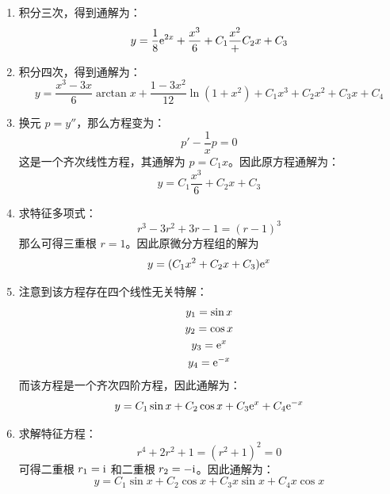 \begin{problem}
    \begin{solution}
        
        \begin{enumerate}
            \item[\textbf{1)}] 积分三次，得到通解为：
            $$
            y = \frac{1}{8} \mathrm{e}^{2x} + \frac{x^3}{6} + C_1 \frac{x^2} + C_2 x + C_3
            $$
            
            \item[\textbf{2)}] 积分四次，得到通解为：
            $$
            y = \frac{x^3 - 3x}{6} \arctan x + \frac{1 - 3x^2}{12} \ln (1 + x^2) + C_1 x^3 + C_2 x^2 + C_3 x + C_4
            $$
    
            \item[\textbf{3)}] 换元 $p = y''$，那么方程变为：
            $$
            p' - \frac{1}{x} p = 0
            $$
            这是一个齐次线性方程，其通解为 $p = C_1 x$。因此原方程通解为：
            $$
            y = C_1 \frac{x^3}{6} + C_2 x + C_3
            $$
    
            \item[\textbf{4)}] 求特征多项式：
            $$
            r^3 - 3r^2 + 3r - 1 = (r - 1)^3
            $$
            那么可得三重根 $r = 1$。因此原微分方程组的解为
            $$
            y = (C_1 x^2 + C_2 x + C_3) \mathrm{e}^{x}
            $$
    
            \item[\textbf{5)}] 注意到该方程存在四个线性无关特解：
            $$
            \begin{gathered}
                y_1 = \sin x \\
                y_2 = \cos x \\
                y_3 = \mathrm{e}^{x} \\
                y_4 = \mathrm{e}^{-x}
            \end{gathered}
            $$
            而该方程是一个齐次四阶方程，因此通解为：
            $$
            y = C_1 \sin x + C_2 \cos x + C_3 \mathrm{e}^{x} + C_4 \mathrm{e}^{-x}
            $$
    
            \item[\textbf{6)}] 求解特征方程：
            $$
            r^4 + 2r^2 + 1 = (r^2 + 1)^2 = 0
            $$
            可得二重根 $r_1 = \mathrm{i}$ 和二重根 $r_2 = -\mathrm{i}$。因此通解为：
            $$
            y = C_1 \sin x + C_2 \cos x + C_3 x \sin x + C_4 x \cos x
            $$
        \end{enumerate}
    \end{solution}
\end{problem}

